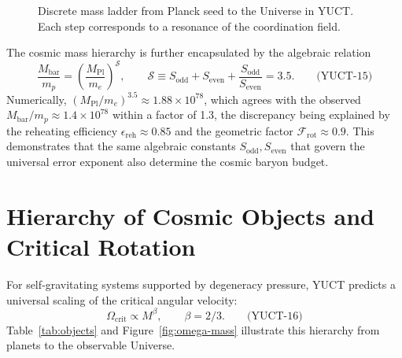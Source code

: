 \documentclass[12pt,a4paper]{article}
\newcommand{\betaf}{\beta}
\newcommand{\Sodd}{S_{\mathrm{odd}}}
\newcommand{\Seven}{S_{\mathrm{even}}}
\newcommand{\Mbar}{M_{\mathrm{bar}}}
\begin{document}
	\begin{figure}[htbp]
		\centering
		\caption{Discrete mass ladder from Planck seed to the Universe in YUCT. Each step corresponds to a resonance of the coordination field.}
		\label{fig:hierarchy-scheme}
	\end{figure}
	
	The cosmic mass hierarchy is further encapsulated by the algebraic relation
	\[
	\boxed{\frac{\Mbar}{m_p} = \left(\frac{M_{\mathrm{Pl}}}{m_e}\right)^{\mathcal{S}}},\qquad
	\mathcal{S} \equiv \Sodd + \Seven + \frac{\Sodd}{\Seven} = 3.5. \qquad\text{(YUCT-15)}
	\]
	Numerically, \((M_{\mathrm{Pl}}/m_e)^{3.5} \approx 1.88\times 10^{78}\), which agrees with the observed \(\Mbar/m_p \approx 1.4\times 10^{78}\) within a factor of 1.3, the discrepancy being explained by the reheating efficiency \(\epsilon_{\mathrm{reh}}\approx 0.85\) and the geometric factor \(\mathcal{F}_{\mathrm{rot}}\approx 0.9\). This demonstrates that the same algebraic constants \(S_{\mathrm{odd}}, S_{\mathrm{even}}\) that govern the universal error exponent also determine the cosmic baryon budget.
	
	\section{Hierarchy of Cosmic Objects and Critical Rotation}
	
	For self‑gravitating systems supported by degeneracy pressure, YUCT predicts a universal scaling of the critical angular velocity:
	\[
	\Omega_{\mathrm{crit}} \propto M^{\betaf},\qquad \betaf = 2/3. \qquad\text{(YUCT-16)}
	\]
	Table~\ref{tab:objects} and Figure~\ref{fig:omega-mass} illustrate this hierarchy from planets to the observable Universe.
	
\end{document}
